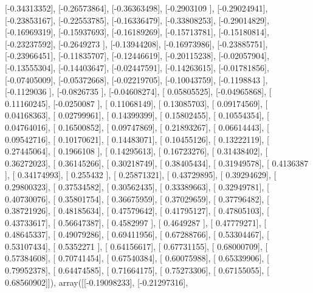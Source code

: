 \documentclass{article}
\begin{document}
       [-0.34313352],
       [-0.26573864],
       [-0.36363498],
       [-0.2903109 ],
       [-0.29024941],
       [-0.23853167],
       [-0.22553785],
       [-0.16336479],
       [-0.33808253],
       [-0.29014829],
       [-0.16969319],
       [-0.15937693],
       [-0.16189269],
       [-0.15713781],
       [-0.15180814],
       [-0.23237592],
       [-0.2649273 ],
       [-0.13944208],
       [-0.16973986],
       [-0.23885751],
       [-0.23966451],
       [-0.11835707],
       [-0.12446619],
       [-0.20115238],
       [-0.02057904],
       [-0.13555304],
       [-0.14403647],
       [-0.02447591],
       [-0.14263615],
       [-0.01781856],
       [-0.07405009],
       [-0.05372668],
       [-0.02219705],
       [-0.10043759],
       [-0.1198843 ],
       [-0.1129036 ],
       [-0.0826735 ],
       [-0.04608274],
       [ 0.05805525],
       [-0.04965868],
       [ 0.11160245],
       [-0.0250087 ],
       [ 0.11068149],
       [ 0.13085703],
       [ 0.09174569],
       [ 0.04168363],
       [ 0.02799961],
       [ 0.14399399],
       [ 0.15802455],
       [ 0.10554354],
       [ 0.04764016],
       [ 0.16500852],
       [ 0.09747869],
       [ 0.21893267],
       [ 0.06614443],
       [ 0.09542716],
       [ 0.10170621],
       [ 0.14483071],
       [ 0.10455126],
       [ 0.13222119],
       [ 0.27445064],
       [ 0.1966108 ],
       [ 0.14295613],
       [ 0.16723276],
       [ 0.31438402],
       [ 0.36272023],
       [ 0.36145266],
       [ 0.30218749],
       [ 0.38405434],
       [ 0.31949578],
       [ 0.4136387 ],
       [ 0.34174993],
       [ 0.255432  ],
       [ 0.25871321],
       [ 0.43729895],
       [ 0.39294629],
       [ 0.29800323],
       [ 0.37534582],
       [ 0.30562435],
       [ 0.33389663],
       [ 0.32949781],
       [ 0.40730076],
       [ 0.35801754],
       [ 0.36675959],
       [ 0.37029659],
       [ 0.37796482],
       [ 0.38721926],
       [ 0.48185634],
       [ 0.47579642],
       [ 0.41795127],
       [ 0.47805103],
       [ 0.43733617],
       [ 0.56647387],
       [ 0.4582997 ],
       [ 0.4649287 ],
       [ 0.47779271],
       [ 0.48645337],
       [ 0.49079286],
       [ 0.69411956],
       [ 0.67288766],
       [ 0.53304467],
       [ 0.53107434],
       [ 0.5352271 ],
       [ 0.64156617],
       [ 0.67731155],
       [ 0.68000709],
       [ 0.57384608],
       [ 0.70741454],
       [ 0.67540384],
       [ 0.60075988],
       [ 0.65339906],
       [ 0.79952378],
       [ 0.64474585],
       [ 0.71664175],
       [ 0.75273306],
       [ 0.67155055],
       [ 0.68560902]]), array([[-0.19098233],
       [-0.21297316],
\end{document}
